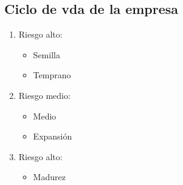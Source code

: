 \subsection{Ciclo de vda de la empresa}
\begin{enumerate}
    \item Riesgo alto: 
        \begin{itemize}
             \item Semilla
            \item Temprano
        \end{itemize}
    
    \item Riesgo medio:
        \begin{itemize}
            \item Medio
            \item Expansión
        \end{itemize}
        
    \item Riesgo alto: 
        \begin{itemize}
            \item Madurez
        \end{itemize}
\end{enumerate}




